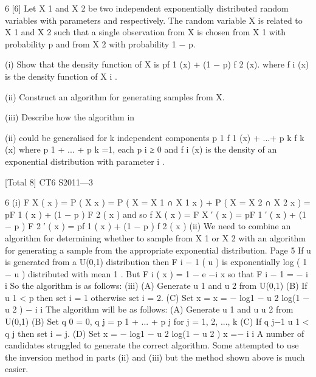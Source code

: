 6
[6]
Let X 1 and X 2 be two independent exponentially distributed random variables with
parameters  and  respectively. The random variable X is related to X 1 and X 2
such that a single observation from X is chosen from X 1 with probability p and from
X 2 with probability 1 − p.
\item (i)
Show that the density function of X is
pf 1 (x) + (1 − p) f 2 (x).
where f i (x) is the density function of X i . 
\item (ii) Construct an algorithm for generating samples from X. 
\item (iii) Describe how the algorithm in \item (ii) could be generalised for k independent
components p 1 f 1 (x) + ...+ p k f k (x) where p 1 + ... + p k =1, each p i ≥ 0 and f i (x)
is the density of an exponential distribution with parameter \lambda  i .

[Total 8]
CT6 S2011—3


6
(i)
F X ( x ) = P ( X \leq  x ) = P ( X = X 1 ∩ X 1 \leq  x ) + P ( X = X 2 ∩ X 2 \leq  x )
= pF 1 ( x ) + (1 − p ) F 2 ( x )
and so f X ( x ) = F X ′ ( x ) = pF 1 ′ ( x ) + (1 − p ) F 2 ′ ( x ) = pf 1 ( x ) + (1 − p ) f 2 ( x )
(ii)
We need to combine an algorithm for determining whether to sample from X 1
or X 2 with an algorithm for generating a sample from the appropriate
exponential distribution.
Page 5%
If u is generated from a U(0,1) distribution then F i − 1 ( u ) is exponentially
log ( 1 − u )
distributed with mean 1 . But F i ( x ) = 1 − e −\lambda  i x so that F i − 1 = −
\lambda  i
\lambda 
i
So the algorithm is as follows:
(iii)
(A) Generate u 1 and u 2 from U(0,1)
(B) If u 1 < p then set i = 1 otherwise set i = 2.
(C) Set x = x = −
log1 − u 2 log(1 − u 2 )
−
\lambda  i
\lambda  i
The algorithm will be as follows:
(A) Generate u 1 and u u 2 from U(0,1)
(B) Set q 0 = 0, q j = p 1 + ... + p j for j = 1, 2, ..., k
(C) If q j−1 \leq  u 1 < q j then set i = j.
(D) Set x = −
log1 − u 2
log(1 − u 2 )
x =−
\lambda  i
\lambda  i
A number of candidates struggled to generate the correct algorithm. Some attempted to use
the inversion method in parts (ii) and (iii) but the method shown above is much easier.

